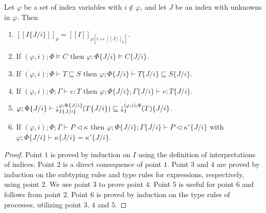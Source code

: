 %
\begin{lemma}\label{lemma:isbg}
Let $\varphi$ be a set of index variables with $i\notin\varphi$, and let $J$ be an index with unknowns in $\varphi$. Then
\begin{enumerate}
    \item $[\![I\{J/i\}]\!]_\rho = [\![I]\!]_{\rho[i \mapsto [\![J]\!]_\rho]}$.
    \item If $(\varphi,i);\Phi\vDash C$ then $\varphi;\Phi\{J/i\}\vDash C\{J/i\}$.
    \item If $(\varphi,i);\Phi\vdash T \sqsubseteq S$ then $\varphi;\Phi\{J/i\}\vdash T\{J/i\} \sqsubseteq S\{J/i\}$.
    \item If $(\varphi,i);\Phi;\Gamma\vdash e : T$ then $\varphi;\Phi\{J/i\};\Gamma\{J/i\}\vdash e : T\{J/i\}$.
    \item $\varphi;\Phi\{J/i\}\vdash\; \susume{T\{J/i\}}{\varphi}{\Phi\{J/i\}}{I\{J/i\}} \sqsubseteq\; \susume{T}{(\varphi,i)}{\Phi}{I}\{J/i\}$.
    \item If $(\varphi,i);\Phi;\Gamma\vdash P \triangleleft \kappa$ then $\varphi;\Phi\{J/i\};\Gamma\{J/i\}\vdash P \triangleleft \kappa'\{J/i\}$ with $\varphi;\Phi\{J/i\}\vdash \kappa\{J/i\} = \kappa'\{J/i\}$.
\end{enumerate}
\begin{proof} Point $1$ is proved by induction on $I$ using the definition of interpretations of indices. Point $2$ is a direct consequence of point $1$. Point $3$ and $4$ are proved by induction on the subtyping rules and type rules for expressions, respectively, using point $2$. We use point $3$ to prove point $4$. Point $5$ is useful for point $6$ and follows from point $2$. Point $6$ is proved by induction on the type rules of processes, utilizing point $3$, $4$ and $5$.
\end{proof}
\end{lemma}
